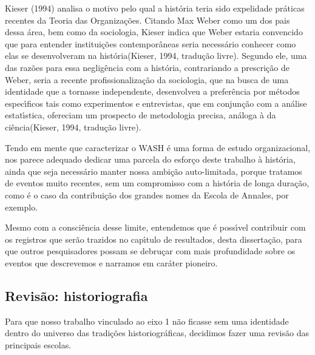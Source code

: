 \documentclass[
12pt,		%
openright,	%
twoside,  %
a4paper,			%
chapter=TITLE,		%
english,			%
french,				%
spanish,			%
brazil				%
]{USPSC-classe/USPSC}
\begin{document}
Kieser (1994)  analisa o motivo pelo qual a hist\'oria teria sido \textquotedbl expelida\textquotedbl  de pr\'aticas recentes da Teoria das Organiza\c{c}\~oes. Citando Max Weber como um dos pais dessa \'area, bem como da sociologia, Kieser indica que Weber estaria \textquotedbl convencido que para entender institui\c{c}\~oes contempor\^aneas seria necess\'ario conhecer como elas se desenvolveram na hist\'oria\textquotedbl   (Kieser, 1994, tradu\c{c}\~ao livre). Segundo ele, uma das raz\~oes para essa neglig\^encia com a hist\'oria, contrariando a prescri\c{c}\~ao de Weber, seria a recente profissionaliza\c{c}\~ao da sociologia, que na busca de uma identidade que a tornasse independente, desenvolveu a prefer\^encia por m\'etodos espec\'{\i}ficos tais como experimentos e entrevistas, que \textquotedbl em conjun\c{c}\~ao com a an\'alise estat\'{\i}stica, ofereciam um prospecto de metodologia precisa, an\'aloga \`a da ci\^encia\textquotedbl   (Kieser, 1994, tradu\c{c}\~ao livre).








Tendo em mente que caracterizar o WASH \'e uma forma de estudo organizacional, nos parece adequado dedicar uma parcela do esfor\c{c}o deste trabalho \`a hist\'oria, ainda que seja necess\'ario manter nossa ambi\c{c}\~ao auto-limitada, porque tratamos de eventos muito recentes, sem um compromisso com a hist\'oria de longa dura\c{c}\~ao, como \'e o caso da contribui\c{c}\~ao dos grandes nomes da Escola de Annales, por exemplo.








Mesmo com a consci\^encia desse limite, entendemos que \'e poss\'{\i}vel contribuir com os registros que ser\~ao trazidos no cap\'{\i}tulo de resultados, desta disserta\c{c}\~ao, para que outros pesquisadores possam se debru\c{c}ar com mais profundidade sobre os eventos que descrevemos e narramos em car\'ater pioneiro.








\subsection[Revis\~ao: historiografia]{Revis\~ao: historiografia}\label{Revis\~ao: historiografia}
Para que nosso trabalho vinculado ao eixo 1 n\~ao ficasse sem uma identidade dentro do universo das tradi\c{c}\~oes historiogr\'aficas, decidimos fazer uma revis\~ao das principais escolas.
\end{document}
